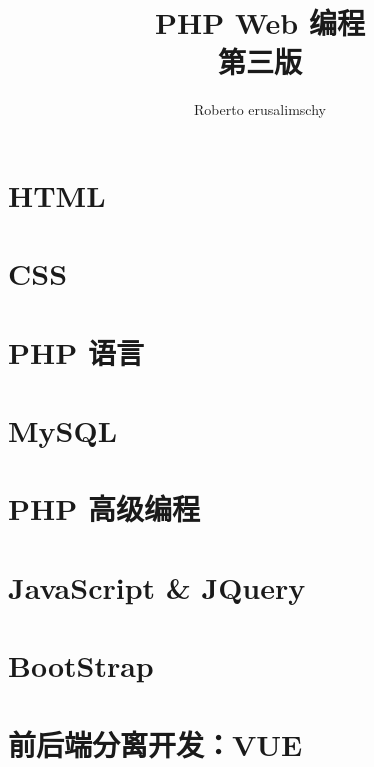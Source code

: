 \documentclass[UTF8]{ctexbook}
\begin{document}
    \title{PHP Web 编程\\第三版}
    \author{Roberto erusalimschy}
    \maketitle
    \tableofcontents
    \frontmatter
    
    \mainmatter
    \part{HTML}
    
    
    \part{CSS}
    \part{PHP 语言}
    \part{MySQL}
    \part{PHP 高级编程}
    \part{JavaScript \& JQuery}
    \part{BootStrap}
    \part{前后端分离开发：VUE}
    \appendix
    
    
    \backmatter
    
\end{document}
